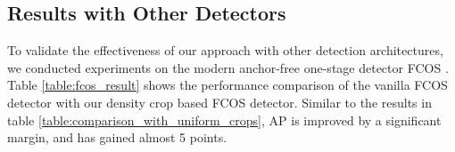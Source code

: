 \begin{table}
    \centering
    \caption{Comparison of iterative merging strategy with single-step merging where GT boxes are scaled according to scaling factors, and scaled uniformly by pixel values.}
    \label{table:scale_by_factor}
\end{table}

\subsection{Results with Other Detectors}
To validate the effectiveness of our approach with other detection architectures, we conducted experiments on the modern anchor-free one-stage detector FCOS \cite{fcos-Tian-2019}. Table \ref{table:fcos_result} shows the performance comparison of the vanilla FCOS detector with our density crop based FCOS detector. Similar to the results in table \ref{table:comparison_with_uniform_crops}, \textrm{AP} is improved by a significant margin, and  has gained almost 5 points. 

